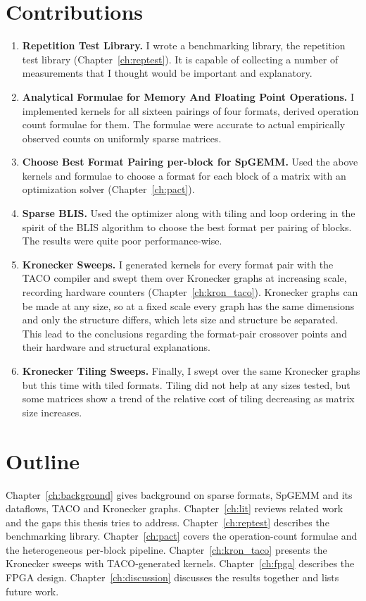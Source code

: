 \section{Contributions}
\begin{enumerate}
  \item \textbf{Repetition Test Library.} I wrote a benchmarking library, the repetition test library (Chapter~\ref{ch:reptest}). It is capable of collecting a number of measurements that I thought would be important and explanatory.
  \item \textbf{Analytical Formulae for Memory And Floating Point Operations.} I implemented kernels for all sixteen pairings of four formats, derived operation count formulae for them. The formulae were accurate to actual empirically observed counts on uniformly sparse matrices.
  \item \textbf{Choose Best Format Pairing per-block for SpGEMM.} Used the above kernels and formulae to choose a format for each block of a matrix with an optimization solver (Chapter~\ref{ch:pact}).
  \item \textbf{Sparse BLIS.} Used the optimizer along with tiling and loop ordering in the spirit of the BLIS algorithm to choose the best format per pairing of blocks. The results were quite poor performance-wise.
  \item \textbf{Kronecker Sweeps.} I generated kernels for every format pair with the TACO compiler and swept them over Kronecker graphs at increasing scale, recording hardware counters (Chapter~\ref{ch:kron_taco}). Kronecker graphs can be made at any size, so at a fixed scale every graph has the same dimensions and only the structure differs, which lets size and structure be separated. This lead to the conclusions regarding the format-pair crossover points and their hardware and structural explanations.
  \item \textbf{Kronecker Tiling Sweeps.} Finally, I swept over the same Kronecker graphs but this time with tiled formats. Tiling did not help at any sizes tested,
    but some matrices show a trend of the relative cost of tiling decreasing as matrix size increases.
\end{enumerate}

\section{Outline}

Chapter~\ref{ch:background} gives background on sparse formats, SpGEMM and its dataflows, TACO and Kronecker graphs. Chapter~\ref{ch:lit} reviews related work and the gaps this thesis tries to address. Chapter~\ref{ch:reptest} describes the benchmarking library. Chapter~\ref{ch:pact} covers the operation-count formulae and the heterogeneous per-block pipeline. Chapter~\ref{ch:kron_taco} presents the Kronecker sweeps with TACO-generated kernels. Chapter~\ref{ch:fpga} describes the FPGA design. Chapter~\ref{ch:discussion} discusses the results together and lists future work.
